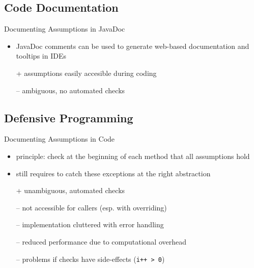 \subsection{Code Documentation}
\begin{frame}{\insertsubsection}
	\begin{fancycolumns}[t]
		\begin{exampletight}{Documenting Assumptions in JavaDoc}
			\centering\makebox{\usebox{\javadoc}}
		\end{exampletight}
		\nextcolumn
		\begin{definition}{\insertsubsection}
			\begin{itemize}
				\item JavaDoc comments can be used to generate web-based documentation and tooltips in IDEs
				\item[+] assumptions easily accesible during coding
				\item[--] ambiguous, no automated checks
			\end{itemize}
		\end{definition}
	\end{fancycolumns}
\end{frame}

\subsection{Defensive Programming}
\begin{frame}{\insertsubsection}
	\begin{fancycolumns}
		\begin{exampletight}{Documenting Assumptions in Code}
			\centering{}
		\end{exampletight}
	\nextcolumn
		\begin{definition}{\insertsubsection}
			\begin{itemize}
				\item principle: check at the beginning of each method that all assumptions hold
				\item still requires to catch these exceptions at the right abstraction
				\item[+] unambiguous, automated checks
				\item[--] not accessible for callers (esp. with overriding)
				\item[--] implementation cluttered with error handling
				\item[--] reduced performance due to computational overhead
				\item[--] problems if checks have side-effects (\lstinline|i++ > 0|)
			\end{itemize}
		\end{definition}
	\end{fancycolumns}
\end{frame}


